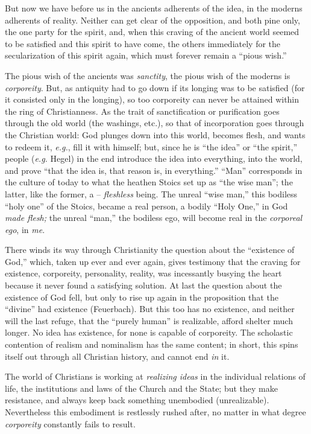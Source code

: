 \documentclass[12pt,a4paper]{book}
\begin{document}
But now we have before us in the ancients adherents of the idea, in the 
moderns adherents of reality. Neither can get clear of the opposition, and 
both pine only, the one party for the spirit, and, when this craving of the 
ancient world seemed to be satisfied and this spirit to have come, the others 
immediately for the secularization of this spirit again, which must forever 
remain a ``pious wish.''

The pious wish of the ancients was \textit{sanctity}, the pious wish of the 
moderns is \textit{corporeity}. But, as antiquity had to go down if its 
longing was to be satisfied (for it consisted only in the longing), so too 
corporeity can never be attained within the ring of Christianness. As the 
trait of sanctification or purification goes through the old world (the 
washings, etc.), so that of incorporation goes through the Christian world: 
God plunges down into this world, becomes flesh, and wants to redeem it, 
\textit{e.g.}, fill it with himself; but, since he is ``the idea'' or 
``the spirit,'' people (\textit{e.g.} Hegel) in the end introduce the idea 
into everything, into the world, and prove ``that the idea is, that reason 
is, in everything.'' ``Man'' corresponds in the culture of today to what 
the heathen Stoics set up as ``the wise man''; the latter, like the former, 
a -- \textit{fleshless} being. The unreal ``wise man,'' this bodiless 
``holy one'' of the Stoics, became a real person, a bodily ``Holy One,'' 
in God \textit{made flesh;} the unreal ``man,'' the bodiless ego, will 
become real in the \textit{corporeal ego}, in \textit{me}.

There winds its way through Christianity the question about the ``existence 
of God,'' which, taken up ever and ever again, gives testimony that the 
craving for existence, corporeity, personality, reality, was incessantly 
busying the heart because it never found a satisfying solution. At last the 
question about the existence of God fell, but only to rise up again in the 
proposition that the ``divine'' had existence (Feuerbach). But this too has 
no existence, and neither will the last refuge, that the ``purely human'' is 
realizable, afford shelter much longer. No idea has existence, for none is 
capable of corporeity. The scholastic contention of realism and nominalism has 
the same content; in short, this spins itself out through all Christian 
history, and cannot end \textit{in} it.

The world of Christians is working at \textit{realizing ideas} in the 
individual relations of life, the institutions and laws of the Church and the 
State; but they make resistance, and always keep back something unembodied 
(unrealizable). Nevertheless this embodiment is restlessly rushed after, no 
matter in what degree \textit{corporeity} constantly fails to result.
\end{document}
